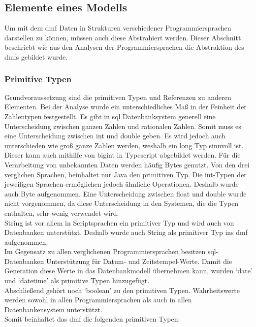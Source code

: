 \documentclass[./einleitung.tex]{subfiles}
\begin{document}
    \subsection{Elemente eines Modells}
    Um mit dem \acrshort{dmf} Daten in Strukturen verschiedener Programmiersprachen darstellen zu können, müssen auch diese Abstrahiert werden.
    Dieser Abschnitt beschriebt wie aus den Analysen der Programmiersprachen die Abstraktion des \acrshort{dmf}s gebildet wurde.

    \subsubsection{Primitive Typen}
    Grundvoraussetzung sind die primitiven Typen und Referenzen zu anderen Elementen.
    Bei der Analyse wurde ein unterschiedliches Maß in der Feinheit der Zahlentypen festgestellt.
    Es gibt in \acrfull{sql} Datenbanksystem generell eine Unterscheidung zwischen ganzen Zahlen und rationalen Zahlen.
    Somit muss es eine Unterscheidung zwischen int und double geben.
    Es wird jedoch auch unterschieden wie groß ganze Zahlen werden, weshalb ein long Typ sinnvoll ist.
    Dieser kann auch mithilfe von bigint in Typescript abgebildet werden.
    Für die Verarbeitung von unbekannten Daten werden häufig Bytes genutzt.
    Von den drei verglichen Sprachen, beinhaltet nur Java den primitiven Typ.
    Die int-Typen der jeweiligen Sprachen ermöglichen jedoch ähnliche Operationen.
    Deshalb wurde auch Byte aufgenommen.
    Eine Unterscheidung zwischen float und double wurde nicht vorgenommen, da diese Unterscheidung in den Systemen, die die Typen enthalten, sehr wenig verwendet wird.\\
    String ist vor allem in Scriptsprachen ein primitiver Typ und wird auch von Datenbanken unterstützt.
    Deshalb wurde auch String als primitiver Typ ins \acrshort{dmf} aufgenommen.\\
    Im Gegensatz zu allen verglichenen Programmiersprachen besitzen \acrshort{sql}-Datenbanken Unterstützung für Datum- und Zeitstempel-Werte.
    Damit die Generation diese Werte in das Datenbankmodell übernehmen kann, wurden `date' und `datetime' als primitive Typen hinzugefügt. \\
    Abschließend gehört noch `boolean' zu den primitiven Typen.
    Wahrheitswerte werden sowohl in allen Programmiersprachen als auch in allen Datenbankensystem unterstützt. \\

    Somit beinhaltet das \acrshort{dmf} die folgenden primitiven Typen:
\end{document}
